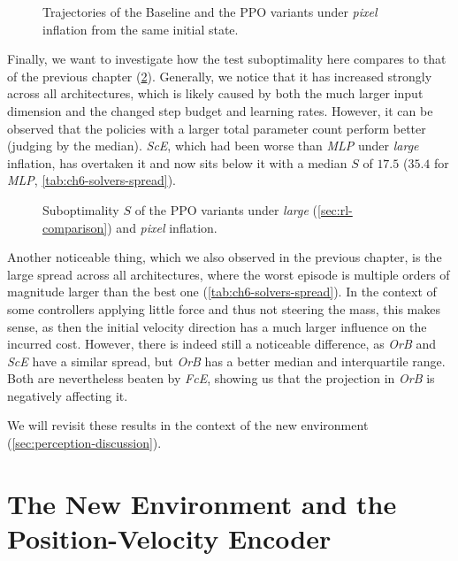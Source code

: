 \begin{figure}[htbp]
    \centering
    \caption{Trajectories of the Baseline and the PPO variants under \emph{pixel} inflation from the same initial state.}
    \label{fig:pixel-inflation-trajectories}
\end{figure}

Finally, we want to investigate how the test suboptimality here compares to that of the
previous chapter (\cref{fig:pixel-inflation-subopt}). Generally, we notice that it has increased strongly across all architectures, which
is likely caused by both the much larger input dimension and the changed step budget and learning rates.
However, it can be observed that the policies with a larger total parameter count
perform better (judging by the median). \emph{ScE}, which had been worse than \emph{MLP} under \emph{large}
inflation, has overtaken it and now sits below it with a median $S$ of $17.5$
($35.4$ for \emph{MLP}, \cref{tab:ch6-solvers-spread}).

\begin{figure}[htbp]
    \centering
    \caption{Suboptimality $S$ of the PPO variants under \emph{large} (\cref{sec:rl-comparison}) and \emph{pixel} inflation.}
    \label{fig:pixel-inflation-subopt}
\end{figure}

Another noticeable thing, which we also observed in the previous chapter, is the large spread across all architectures, where the worst episode
is multiple orders of magnitude larger than the best one (\cref{tab:ch6-solvers-spread}). In the context of some controllers applying little
force and thus not steering the mass, this makes sense, as then the initial velocity direction has a much larger influence on the incurred
cost. However, there is indeed still a noticeable difference, as \emph{OrB} and \emph{ScE} have a similar spread,
but \emph{OrB} has a better median and interquartile range. Both are nevertheless beaten by \emph{FcE}, showing
us that the projection in \emph{OrB} is negatively affecting it.



We will revisit these results in the context of the new environment (\cref{sec:perception-discussion}).

\section[The New Environment and the Position-Velocity Encoder]{The New Environment and the\\Position-Velocity Encoder}
\label{sec:pixel-env}

